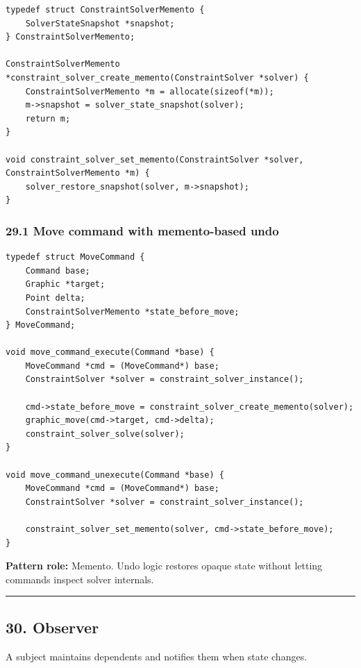 \documentclass[11pt]{article}
\begin{document}
\begin{verbatim}
typedef struct ConstraintSolverMemento {
    SolverStateSnapshot *snapshot;
} ConstraintSolverMemento;

ConstraintSolverMemento *constraint_solver_create_memento(ConstraintSolver *solver) {
    ConstraintSolverMemento *m = allocate(sizeof(*m));
    m->snapshot = solver_state_snapshot(solver);
    return m;
}

void constraint_solver_set_memento(ConstraintSolver *solver, ConstraintSolverMemento *m) {
    solver_restore_snapshot(solver, m->snapshot);
}
\end{verbatim}

\subsubsection{29.1 Move command with memento-based undo}\label{move-command-with-memento-based-undo}

\begin{verbatim}
typedef struct MoveCommand {
    Command base;
    Graphic *target;
    Point delta;
    ConstraintSolverMemento *state_before_move;
} MoveCommand;

void move_command_execute(Command *base) {
    MoveCommand *cmd = (MoveCommand*) base;
    ConstraintSolver *solver = constraint_solver_instance();

    cmd->state_before_move = constraint_solver_create_memento(solver);
    graphic_move(cmd->target, cmd->delta);
    constraint_solver_solve(solver);
}

void move_command_unexecute(Command *base) {
    MoveCommand *cmd = (MoveCommand*) base;
    ConstraintSolver *solver = constraint_solver_instance();

    constraint_solver_set_memento(solver, cmd->state_before_move);
}
\end{verbatim}

\textbf{Pattern role:} Memento. Undo logic restores opaque state without letting commands inspect solver internals.

\begin{center}\rule{0.5\linewidth}{0.5pt}\end{center}

\subsection{30. Observer}\label{observer}

A subject maintains dependents and notifies them when state changes.
\end{document}
